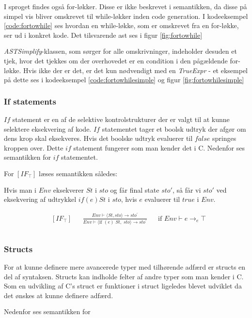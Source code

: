 \noindent I sproget findes også for-løkker. Disse er ikke beskrevet i semantikken, da disse på simpel vis bliver omskrevet til while-løkker inden code generation. I kodeeksempel \ref{code:fortowhile} ses hvordan en while-løkke, som er omskrevet fra en for-løkke, ser ud i konkret kode. Det tilsvarende \gls{ast} ses i figur \ref{fig:fortowhile}



\noindent \textit{ASTSimplify}-klassen, som sørger for alle omskrivninger, indeholder desuden et tjek, hvor det tjekkes om der overhovedet er en condition i den pågældende for-løkke. Hvis ikke der er det, er det kun nødvendigt med en \textit{TrueExpr} - et eksempel på dette ses i kodeeksempel \ref{code:fortowhilesimple} og figur \ref{fig:fortowhilesimple}



\subsubsection*{If statements}
$If$ statement er en af de selektive kontrolstrukturer der er valgt til at kunne selektere eksekvering af kode. $If$ statementet tager et boolsk udtryk der afgør om dens krop skal eksekveres. Hvis det boolske udtryk evaluerer til $false$ springes kroppen over. Dette $if$ statement fungerer som man kender det i C. Nedenfor ses semantikken for $if$ statementet.

\noindent For $[IF_\top]$ læses semantikken således: 

Hvis man i $Env$ eksekverer $St$ i $sto$ og får final state $sto'$, så får vi $sto'$ ved eksekvering af udtrykkel $if(e)  St$ i $sto$, hvis $e$ evaluerer til $true$ i $Env$.

\begin{align*}
&[IF_\top] & &\frac{Env \vdash \langle St, sto \rangle \rightarrow sto^\prime}{Env \vdash \langle \text{if } (e)\; St,\; sto \rangle \rightarrow sto^\prime} & &\text{if } Env \vdash e \rightarrow_e \top\\\\
\end{align*}

\subsubsection*{Structs}
For at kunne definere mere avancerede typer med tilhørende adfærd er structs en del af syntaksen. Structs kan indholde felter af andre typer som man kender i C. Som en udvikling af C's struct er funktioner i struct ligeledes blevet udviklet da det ønskes at kunne definere adfærd.

Nedenfor ses semantikken for 
